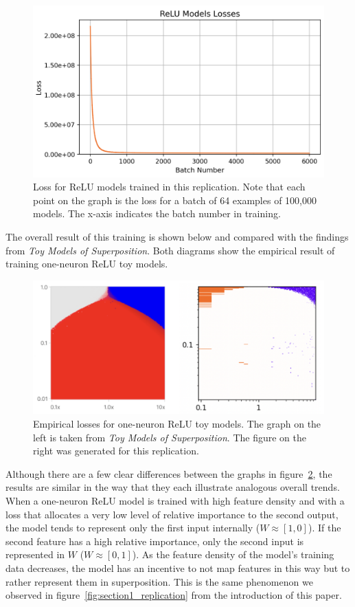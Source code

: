 \documentclass{article} %
\begin{document}
\begin{figure}[h]
    \centering
    \includegraphics[width=0.5\linewidth]{phase_changes/images/relu_loss.png}
    \captionsetup{font=footnotesize, width=0.7\linewidth} %
    \caption{
        Loss for ReLU models trained in this replication. Note that each point
        on the graph is the loss for a batch of 64 examples of 100,000 models. 
        The x-axis indicates the batch number in training.
    }
    \label{fig:relu_loss}
\end{figure}

The overall result of this training is shown below and compared with the findings
from \textit{Toy Models of Superposition}. Both diagrams show
the empirical result of training one-neuron ReLU toy models.

\begin{figure}[h]
    \centering
    \includegraphics[width=0.5\linewidth]{phase_changes/images/relu_empirical.png}
    \captionsetup{font=footnotesize, width=0.7\linewidth} %
    \caption{
        Empirical losses for one-neuron ReLU toy models. The graph on the left
        is taken from \textit{Toy Models of Superposition}. The figure on the
        right was generated for this replication.
    }
    \label{fig:relu_empirical}
\end{figure}

Although there are a few clear differences between the graphs in
figure~\ref{fig:relu_empirical}, the results are similar in the way that they
each illustrate
analogous overall trends. When a one-neuron ReLU model is trained with high feature
density and with a loss that allocates a very low level of relative
importance to the second output, the model tends to represent
only the first input internally ($W \approx [1, 0]$). If the second feature has 
a high relative importance, only the second input is represented
in $W$ ($W \approx [0, 1]$). As the feature density of the model's training data
decreases, the model has an incentive to not map features in this way but to rather
represent them in superposition. This is the same phenomenon we observed in 
figure~\ref{fig:section1_replication} from the introduction of this paper.\\
\end{document}

